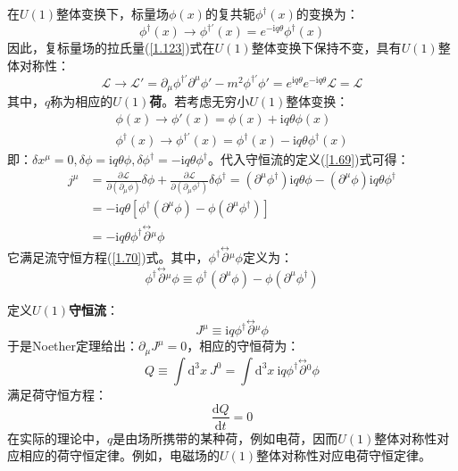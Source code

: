 \documentclass{book}
\begin{document}
在$U(1)$整体变换下，标量场$\phi(x)$的复共轭$\phi^\dagger(x)$的变换为：
\begin{equation}
	\phi^\dagger(x)\to\phi^{\dagger\prime}(x)=e^{-\mathrm{i}q\theta}\phi^\dagger(x)
\end{equation}
因此，复标量场的拉氏量(\ref{1.123})式在$U(1)$整体变换下保持不变，具有$U(1)$整体对称性：
\begin{equation}
	\mathscr{L}\to\mathscr{L}'=\partial_\mu\phi^{\dagger\prime}\partial^\mu\phi'-m^2\phi^{\dagger\prime}\phi'=e^{\mathrm{i}q\theta}e^{-\mathrm{i}q\theta}\mathscr{L}=\mathscr{L}
\end{equation}
其中，$q$称为相应的\textbf{$U(1)$荷}。若考虑无穷小$U(1)$整体变换：
\begin{gather}
	\phi(x)\to\phi'(x)=\phi(x)+\mathrm{i}q\theta\phi(x)\\
	 \phi^\dagger(x)\to\phi^{\dagger\prime}(x)=\phi^\dagger(x)-\mathrm{i}q\theta\phi^\dagger(x)
\end{gather}
即：$\delta x^\mu=0,\delta\phi=\mathrm{i}q\theta\phi,\delta\phi^\dagger=-\mathrm{i}q\theta\phi^\dagger$。代入守恒流的定义(\ref{1.69})式可得：
\begin{equation}
    \begin{aligned}
        j^\mu&=\frac{\partial\mathscr{L}}{\partial(\partial_\mu\phi)}\delta\phi+\frac{\partial\mathscr{L}}{\partial(\partial_\mu\phi^\dagger)}\delta\phi^\dagger=(\partial^\mu\phi^\dagger)\mathrm{i}q\theta\phi-(\partial^\mu\phi)\mathrm{i}q\theta\phi^\dagger\\
        &=-\mathrm{i}q\theta[\phi^\dagger(\partial^\mu\phi)-\phi(\partial^\mu\phi^\dagger)]\\
        &=-\mathrm{i}q\theta\phi^\dagger\overset{\leftrightarrow}{\partial}{}^\mu\phi
    \end{aligned}
\end{equation}
它满足流守恒方程(\ref{1.70})式。其中，$\phi^\dagger\overset{\leftrightarrow}{\partial}{}^\mu\phi$定义为：
\begin{equation}
	\phi^\dagger\overset{\leftrightarrow}{\partial}{}^\mu\phi\equiv\phi^\dagger(\partial^\mu\phi)-\phi(\partial^\mu\phi^\dagger)
\end{equation}

定义\textbf{$U(1)$守恒流}：
\begin{equation}
	J^\mu\equiv \mathrm{i}q\phi^\dagger\overset{{\leftrightarrow}}{\partial}{}^\mu\phi
\end{equation}
于是Noether定理给出：$\partial_\mu J^\mu=0$，相应的守恒荷为：
\begin{equation}
	Q\equiv\int\mathrm{d}^3x\ J^0=\int\mathrm{d}^3x\ \mathrm{i}q\phi^\dagger\overset{{\leftrightarrow}}{\partial}{}^0\phi
\end{equation}
满足荷守恒方程：
\begin{equation}
	\frac{\mathrm{d}Q}{\mathrm{d}t}=0
\end{equation}
在实际的理论中，$q$是由场所携带的某种荷，例如电荷，因而$U(1)$整体对称性对应相应的荷守恒定律。例如，电磁场的$U(1)$整体对称性对应电荷守恒定律。
\end{document}
